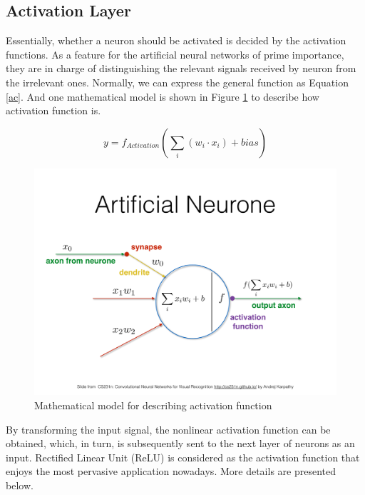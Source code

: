     \subsection{Activation Layer}
    Essentially, whether a neuron should be activated is decided by the activation functions. As a feature for the artificial neural networks of prime importance, they are in charge of distinguishing the relevant signals received by neuron from the irrelevant ones. Normally, we can express the general function as Equation \ref{ac}. And one mathematical model is shown in Figure \ref{action} to describe how activation function is.

    \begin{equation}
        y = f_{Activation}(\sum_{i}(w_i \cdot x_i) + bias)
        \label{ac}
    \end{equation}

    \begin{figure}
        \centering
        \includegraphics[scale=0.3]{Figures/action.pdf}
        \caption{Mathematical model for describing activation function}
        \label{action}
    \end{figure}

    By transforming the input signal, the nonlinear activation function can be obtained, which, in turn,  is subsequently sent to the next layer of neurons as an input. Rectified Linear Unit (ReLU) is considered as the activation function that enjoys the most pervasive application nowadays. More details are presented below. 

